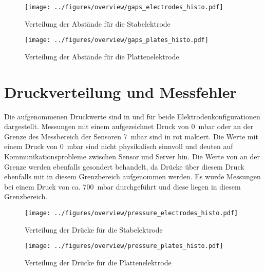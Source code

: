 \begin{figure}[H]
    \centering
    \begin{minipage}[t]{0.47\textwidth}
        \centering
        \texttt{[image: ../figures/overview/gaps\_electrodes\_histo.pdf]}
        \caption{Verteilung der Abstände für die Stabelektrode}
        \label{fig:histogram-gap-stab}
    \end{minipage}
    \hfill
    \begin{minipage}[t]{0.47\textwidth}
        \centering
        \texttt{[image: ../figures/overview/gaps\_plates\_histo.pdf]}
        \caption{Verteilung der Abstände für die Plattenelektrode}
        \label{fig:histogram-gap-platte}
    \end{minipage}
\end{figure}

\section{Druckverteilung und Messfehler}
Die aufgenommenen Druckwerte sind in  und  für beide Elektrodenkonfigurationen dargestellt. Messungen mit einem aufgezeichnet Druck von \SI{0}{\milli\bar} oder an der Grenze des Messbereich der Sensoren \SI{7}{\milli\bar} sind in rot makiert. Die Werte mit einem Druck von \SI{0}{\milli\bar} sind nicht physikalisch sinnvoll und deuten auf Kommunikationsprobleme zwischen Sensor und Server hin. Die Werte von an der Grenze werden ebenfalls gesondert behandelt, da Drücke über diesem Druck ebenfalls mit in diesem Grenzbereich aufgenommen werden. Es wurde Messungen bei einem Druck von ca. \SI{700}{\milli\bar} durchgeführt und diese liegen in diesem Grenzbereich.
\begin{figure}[H]
    \centering
    \begin{minipage}[t]{0.47\textwidth}
        \centering
        \texttt{[image: ../figures/overview/pressure\_electrodes\_histo.pdf]}
        \caption{Verteilung der Drücke für die Stabelektrode}
        \label{fig:histogram-pressure-stab}
    \end{minipage}
    \hfill
    \begin{minipage}[t]{0.47\textwidth}
        \centering
        \texttt{[image: ../figures/overview/pressure\_plates\_histo.pdf]}
        \caption{Verteilung der Drücke für die Plattenelektrode}
        \label{fig:histogram-pressure-platte}
    \end{minipage}
\end{figure}

